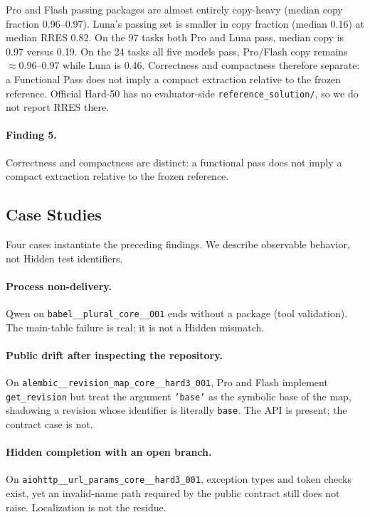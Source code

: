 Pro and Flash passing packages are almost entirely copy-heavy (median copy
fraction 0.96--0.97). Luna's passing set is smaller in copy fraction (median
0.16) at median RRES 0.82. On the 97 tasks both Pro and Luna pass, median
copy is 0.97 versus 0.19. On the 24 tasks all five models pass, Pro/Flash
copy remains $\approx 0.96$--$0.97$ while Luna is 0.46. Correctness and
compactness therefore separate: a Functional Pass does not imply a compact
extraction relative to the frozen reference. Official Hard-50 has no
evaluator-side \texttt{reference\_solution/}, so we do not report RRES there.

\paragraph{Finding 5.}
Correctness and compactness are distinct: a functional pass does not imply
a compact extraction relative to the frozen reference.

\subsection{Case Studies}
\label{sec:cases}

Four cases instantiate the preceding findings. We describe observable
behavior, not Hidden test identifiers.

\paragraph{Process non-delivery.}
Qwen on \texttt{babel\_\_plural\_core\_\_001} ends without a package (tool
validation). The main-table failure is real; it is not a Hidden mismatch.

\paragraph{Public drift after inspecting the repository.}
On \texttt{alembic\_\_revision\_map\_core\_\_hard3\_001}, Pro and Flash
implement \texttt{get\_revision} but treat the argument \texttt{'base'} as
the symbolic base of the map, shadowing a revision whose identifier is
literally \texttt{base}. The API is present; the contract case is not.

\paragraph{Hidden completion with an open branch.}
On \texttt{aiohttp\_\_url\_params\_core\_\_hard3\_001}, exception types and
token checks exist, yet an invalid-name path required by the public contract
still does not raise. Localization is not the residue.


